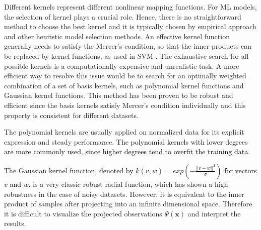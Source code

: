 Different kernels represent different nonlinear mapping functions. For ML models, the selection of kernel plays a crucial role. Hence, there is no straightforward method to choose the best kernel and it is typically chosen by empirical approach and other heuristic model selection methods. An effective kernel function generally needs to satisfy the Mercer's condition, so that the inner products can be replaced by kernel functions, as used in SVM \cite{cristianini2000introduction}. 
The exhaustive search for all possible kernels is a computationally expensive and unrealistic task\cite{chapelle1999support}. A more efficient way to resolve this issue would be to search for an optimally weighted combination of a set of basis kernels, such as polynomial kernel functions and Gaussian kernel functions\cite{lanckriet2002robust}. This method has been proven to be robust and efficient since the basis kernels satisfy Mercer’s condition individually and this property is consistent for different datasets\cite{jebara2004multi}.


The polynomial kernels are usually applied on normalized data for its explicit expression and steady performance. \textcolor{black}{The polynomial kernels with lower degrees are more commonly used, since higher degrees tend to overfit the training data\cite{chang2010training}}.%

The Gaussian kernel function, \textcolor{black}{denoted by $k(v,w)=exp(-\frac{||v-w||^2}{\sigma})$ for vectors $v$ and $w$,} is a very classic robust radial function, which has shown a high robustness in the case of noisy datasets\cite{carr2003smooth}. However, it is equivalent to the inner product of samples after projecting into an infinite dimensional space. Therefore it is difficult to visualize the projected observations $\Psi(\mathbf{x})$ and interpret the results. %

